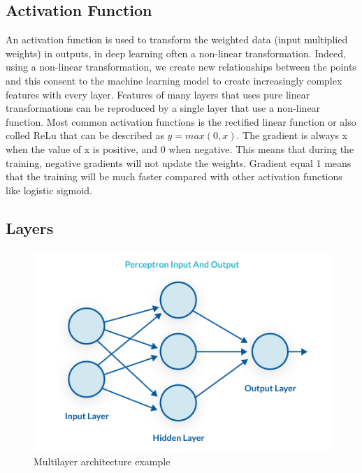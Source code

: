 \documentclass[12pt]{report}
\begin{document}
\subsection{Activation Function}

An activation function is used to transform the weighted data (input multiplied weights) 
in outputs, in deep learning often a non-linear transformation.
Indeed, using a non-linear transformation, we create new relationships between the points
and this consent to the machine learning model to create increasingly complex features with every layer.
Features of many layers that uses pure linear transformations can be reproduced by a single 
layer that use a non-linear function. 
Most common activation functions is the rectified linear function or also colled ReLu that
can be described as $y = max(0, x)$. The gradient is always x when the value of x is positive, 
and 0 when negative. This means that during the training, negative gradients will not update the weights.
Gradient equal 1 means that the training will be much faster compared with other activation functions
like logistic sigmoid.

\subsection{Layers}

\begin{figure}[t]
    \centering
    \includegraphics[scale=.5]{multilayer-perceptron.png}
    \caption{Multilayer architecture example \cite{percepimage}}
    \label{fig:multilayer}
\end{figure}
\end{document}
